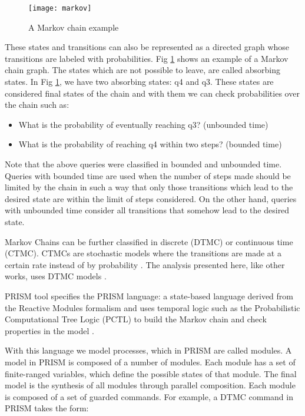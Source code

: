 \documentclass[conference]{IEEEtran}
\begin{document}
	\begin{figure}[!h]
	\centering
	\texttt{[image: markov]}	
	\caption{A Markov chain example}
	\label{fig:markov}
	\end{figure}
	
		These states and transitions can also be represented as a directed graph
	whose transitions are labeled with probabilities. Fig \ref{fig:markov} shows
	an example of a Markov chain graph. The states which are not possible to leave, are called absorbing states.
	In Fig \ref{fig:markov}, we have two absorbing states: q4 and q3.	These states are
	considered final states of the chain and with them we can check probabilities over the chain such as:
	
	\begin{itemize}
		\item What is the probability of eventually reaching q3? (unbounded time)
		\item What is the probability of reaching q4 within two steps? (bounded time)		
	\end{itemize}	
	
	Note that the above queries were classified in bounded and unbounded time.
	Queries with bounded time are used when the number of steps made should be limited by the chain
	in such a way that only those transitions which lead to the desired state are within the limit of steps considered.  
	On the other hand, queries with unbounded time consider all transitions that somehow lead to the desired state.				

	Markov Chains can be further classified in discrete (DTMC) or continuous time (CTMC).
	CTMCs are stochastic models where the transitions are made at a certain rate instead of
	by probability \cite{paramthesis}. The analysis presented here, like other works, uses DTMC models \cite{GhezziSPLC, JSS}.
		
		PRISM tool specifies the PRISM language:
	a state-based language derived from the Reactive Modules formalism and 
	uses temporal logic such as the Probabilistic Computational Tree Logic (PCTL) 
	to build the Markov chain and check properties in the model
	\cite{baier, Hansson94, bianco}.
	
	With this language we model processes, which in PRISM are called modules.
	A model in PRISM is composed of a number of modules. Each module has a set of finite-ranged
	variables, which define the possible states of that module. The final model is the synthesis of
	all modules through parallel composition. Each module is composed of a set of guarded commands. 
	For example, a DTMC command in PRISM takes the form:
	
\end{document}
